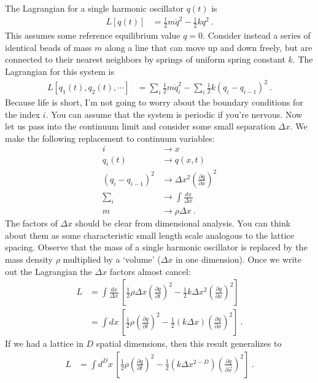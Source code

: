 The Lagrangian for a single harmonic oscillator $q(t)$ is
\begin{align}
	L[q(t)] &= \frac{1}{2}m \dot q^2 - \frac{1}{2}k q^2 \ .
\end{align}
This assumes some reference equilibrium value $q=0$. Consider instead a series of identical beads of mass $m$ along a line that can move up and down freely, but are connected to their nearest neighbors by springs of uniform spring constant $k$. The Lagrangian for this system is
\begin{align}
	L[q_1(t), q_2(t), \cdots]
	&= 
	\sum_i \frac{1}{2} m \dot q_i^2 
	- 
	\sum_i \frac{1}{2}k (q_i - q_{i-1})^2 \ .
\end{align}
Because life is short, I'm not going to worry about the boundary conditions for the index $i$. You can assume that the system is periodic if you're nervous. Now let us pass into the continuum limit and consider some small separation $\Delta x$. We make the following replacement to continuum variables:
\begin{align}
	i & \rightarrow x
	\\
	q_i(t) & \rightarrow q(x,t)
	\\
	(q_i-q_{i-1})^2 &\rightarrow \Delta x^2 \left(\frac{\partial q}{\partial x}\right)^2
	\\
	\sum_i	&\rightarrow \int \frac{dx}{\Delta x}
	\\
	m &\rightarrow \rho \Delta x \ .
\end{align}
The factors of $\Delta x$ should be clear from dimensional analysis. You can think about them as some characteristic small length scale analogous to the lattice spacing. Observe that the mass of a single harmonic oscillator is replaced by the mass density $\rho$ multiplied by a `volume' ($\Delta x$ in one dimension). Once we write out the Lagrangian the $\Delta x$ factors almost cancel:
\begin{align}
	L 
	&= \int \frac{dx}{\Delta x} \, 
	\left[
		\frac{1}{2}\rho \Delta x 
		\left(\frac{\partial q}{\partial t}\right)^2 
		- 
		\frac{1}{2}k \Delta x^2
		\left(\frac{\partial q}{\partial x}\right)^2
	\right]
	\\
	&= \int dx\,
	\left[
		\frac{1}{2}\rho 
		\left(\frac{\partial q}{\partial t}\right)^2 
		- 
		\frac{1}{2} \left(k \Delta x\right)
		\left(\frac{\partial q}{\partial x}\right)^2
	\right] \ .
\end{align}
If we had a lattice in $D$ spatial dimensions, then this result generalizes to
\begin{align}
	L 
	&= \int d^Dx\,
	\left[
		\frac{1}{2}\rho 
		\left( \frac{\partial q}{\partial t} \right)^2 
		- 
		\frac{1}{2} \left(k \Delta x^{2-D}\right)
		\left(\frac{\partial q}{\partial \vec{x}}\right)^2
	\right] \ .
	\label{eq:HO:coupled:D}
\end{align}
